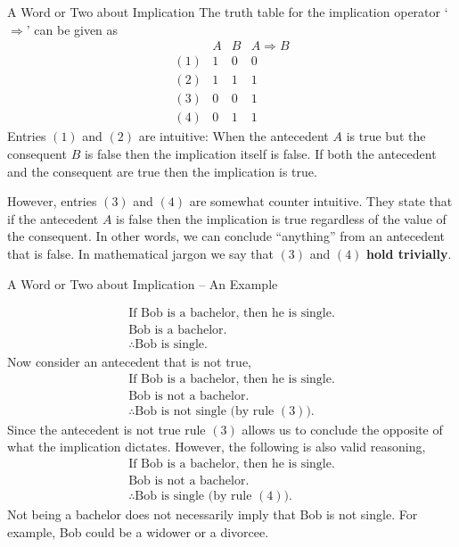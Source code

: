 \documentclass{beamer}
\begin{document}
\begin{frame}{A Word or Two about Implication}
The truth table for the implication operator `$\Rightarrow$' can be given as
{\scriptsize
\[
\begin{array}{lcc|c}
&A & B & A \Rightarrow B\\ \hline
(1)& 1 & 0 & 0\\
(2) & 1 & 1 & 1\\
(3) & 0 & 0 & 1\\
(4) & 0 & 1 & 1
\end{array}
\]
}
Entries $(1)$ and $(2)$ are intuitive: When the antecedent $A$ is true but the consequent $B$ is false then
the implication itself is false.  If both the antecedent and the consequent are true then the implication is true.

\vspace{.1in}

However, entries $(3)$ and $(4)$ are somewhat counter intuitive.  They state that if the antecedent $A$ is false
then the implication is true regardless of the value of the consequent.  In other words, we can conclude ``anything''
from an antecedent that is false.  In mathematical jargon we say that $(3)$ and $(4)$  {\bf hold trivially}.
\end{frame}

\begin{frame}{A Word or Two about Implication -- An Example}

{\scriptsize
\[
\begin{array}{l}
\mbox{If Bob is a bachelor, then he is single.}\\
\mbox{Bob is a bachelor.}\\ \hline
\therefore\mbox{Bob is single.}
\end{array}
\]
}
Now consider an antecedent that is not true,
{\scriptsize
\[
\begin{array}{l}
\mbox{If Bob is a bachelor, then he is single.}\\
\mbox{Bob is not a bachelor.}\\ \hline
\therefore\mbox{Bob is not single (by rule $(3)$).}
\end{array}
\]
}
Since the antecedent is not true rule $(3)$ allows us to conclude the 
opposite of what the implication dictates.  However, the following is also
valid reasoning,
{\scriptsize
\[
\begin{array}{l}
\mbox{If Bob is a bachelor, then he is single.}\\
\mbox{Bob is not a bachelor.}\\ \hline
\therefore\mbox{Bob is  single (by rule $(4)$).}
\end{array}
\]
}
Not being a bachelor does not necessarily imply that Bob is not single.  For example,
Bob could be a widower or a divorcee.
\end{frame}
\end{document}
